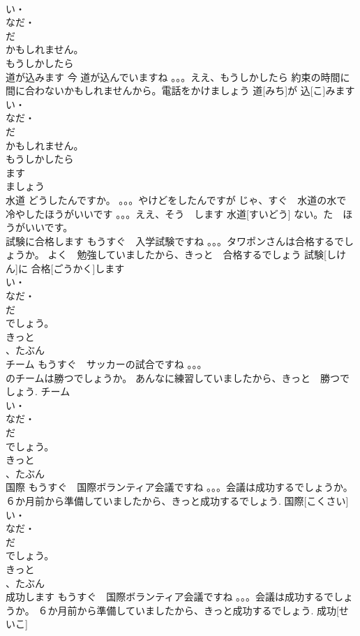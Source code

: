 \documentclass[8pt]{extreport}
\begin{document}
\begin{CJK}{UTF8}{min}
\\	い・
\\	なだ・
\\	だ
\\	かもしれません。
\\	もうしかしたら
\\	道が込みます	今 道が込んでいますね 。。。ええ、もうしかしたら 約束の時間に間に合わないかもしれませんから。電話をかけましょう	道[みち]が 込[こ]みます			
\\	い・
\\	なだ・
\\	だ
\\	かもしれません。
\\	もうしかしたら
\\	ます
\\	ましょう
\\	水道	どうしたんですか。 。。。やけどをしたんですが じゃ、すぐ　水道の水で　冷やしたほうがいいです 。。。ええ、そう　します	水道[すいどう]				ない。た　ほうがいいです。
\\	試験に合格します	もうすぐ　入学試験ですね 。。。タワポンさんは合格するでしょうか。 よく　勉強していましたから、きっと　合格するでしょう	試験[しけん]に 合格[ごうかく]します			
\\	い・
\\	なだ・
\\	だ
\\	でしょう。
\\	きっと
\\	、たぶん
\\	チーム	もうすぐ　サッカーの試合ですね 。。。
\\	のチームは勝つでしょうか。 あんなに練習していましたから、きっと　勝つでしょう.	チーム				
\\	い・
\\	なだ・
\\	だ
\\	でしょう。
\\	きっと
\\	、たぶん
\\	国際	もうすぐ　国際ボランティア会議ですね 。。。会議は成功するでしょうか。 ６か月前から準備していましたから、きっと成功するでしょう.	国際[こくさい]				
\\	い・
\\	なだ・
\\	だ
\\	でしょう。
\\	きっと
\\	、たぶん
\\	成功します	もうすぐ　国際ボランティア会議ですね 。。。会議は成功するでしょうか。 ６か月前から準備していましたから、きっと成功するでしょう.	成功[せいこ]				

\end{CJK}
\end{document}
